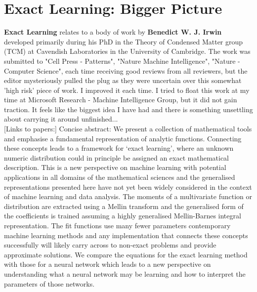 \documentclass{article}
\begin{document}
%




\section{Exact Learning: Bigger Picture}
\textbf{Exact Learning} relates to a body of work by \textbf{Benedict W. J. Irwin} developed primarily during his PhD in the Theory of Condensed Matter group (TCM) at Cavendish Laboratories in the University of Cambridge. The work was submitted to "Cell Press - Patterns", "Nature Machine Intelligence", "Nature - Computer Science", each time receiving good reviews from all reviewers, but the editor mysteriously pulled the plug as they were uncertain over this somewhat 'high risk' piece of work. I improved it each time. I tried to float this work at my time at Microsoft Research - Machine Intelligence Group, but it did not gain traction. It feels like the biggest idea I have had and there is something unsettling about carrying it around unfinished...  \\

[Links to papers:]
Concise abstract: We present a collection of mathematical tools and emphasise a fundamental representation of analytic functions. Connecting these concepts leads to a framework for `exact learning', where an unknown numeric distribution could in principle be assigned an exact mathematical description. This is a new perspective on machine learning with potential applications in all domains of the mathematical sciences and the generalised representations presented here have not yet been widely considered in the context of machine learning and data analysis. The moments of a multivariate function or distribution are extracted using a Mellin transform and the generalised form of the coefficients is trained assuming a highly generalised Mellin-Barnes integral representation. The fit functions use many fewer parameters contemporary machine learning methods and any implementation that connects these concepts successfully will likely carry across to non-exact problems and provide approximate solutions. We compare the equations for the exact learning method with those for a neural network which leads to a new perspective on understanding what a neural network may be learning and how to interpret the parameters of those networks.
\end{document}
